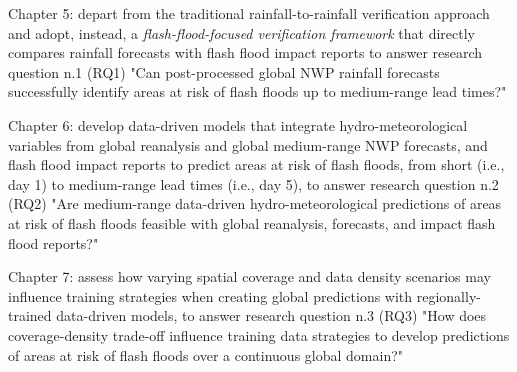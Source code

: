 \begin{tcolorbox}[
  colframe=colour_chapter5,  
  colback=white,           
  sharp corners,        
  boxrule=2mm,          
  left=0mm,             
  right=0mm,            
  toprule=0mm,          
  bottomrule=0mm,       
  rightrule=2mm        
]
{\color{colour_chapter5} {\setlength{\parindent}{1.0em} Chapter 5: depart from the traditional rainfall-to-rainfall verification approach and adopt, instead, a \textit{flash-flood-focused verification framework} that directly compares rainfall forecasts with flash flood impact reports to answer research question n.1 (RQ1) "Can post-processed global NWP rainfall forecasts successfully identify areas at risk of flash floods up to medium-range lead times?"}}
\end{tcolorbox}

\begin{tcolorbox}[
  colframe=colour_chapter6,  
  colback=white,           
  sharp corners,        
  boxrule=2mm,          
  left=0mm,             
  right=0mm,            
  toprule=0mm,          
  bottomrule=0mm,       
  rightrule=2mm        
]
{\color{colour_chapter6} {\setlength{\parindent}{1.0em} Chapter 6: develop data-driven models that integrate hydro-meteorological variables from global reanalysis and global medium-range NWP forecasts, and flash flood impact reports to predict areas at risk of flash floods, from short (i.e., day 1) to medium-range lead times (i.e., day 5), to answer research question n.2 (RQ2) "Are medium-range data-driven hydro-meteorological predictions of areas at risk of flash floods feasible with global reanalysis, forecasts, and impact flash flood reports?"}}
\end{tcolorbox}

\begin{tcolorbox}[
  colframe=colour_chapter7,  
  colback=white,           
  sharp corners,        
  boxrule=2mm,          
  left=0mm,             
  right=0mm,            
  toprule=0mm,          
  bottomrule=0mm,       
  rightrule=2mm        
]
{\color{colour_chapter7} {\setlength{\parindent}{1.0em} Chapter 7: assess how varying spatial coverage and data density scenarios may influence training strategies when creating global predictions with regionally-trained data-driven models, to answer research question n.3 (RQ3) "How does coverage-density trade-off influence training data strategies to develop predictions of areas at risk of flash floods over a continuous global domain?"}}
\end{tcolorbox}

